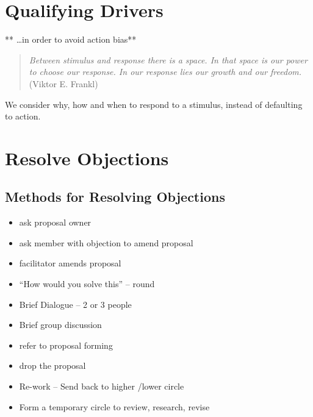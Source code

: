 \section{Qualifying Drivers}
\label{qualifyingdrivers}

** {\ldots}in order to avoid action bias**

\begin{quote}

\emph{Between stimulus and response there is a space. In that space is our power to choose our response. In our response lies our growth and our freedom.} (Viktor E. Frankl)
\end{quote}

We consider why, how and when to respond to a stimulus, instead of defaulting to action.

\section{Resolve Objections}
\label{resolveobjections}

\subsection{Methods for Resolving Objections}
\label{methodsforresolvingobjections}

\begin{itemize}
\item ask proposal owner

\item ask member with objection to amend proposal

\item facilitator amends proposal

\item ``How would you solve this'' – round

\item Brief Dialogue – 2 or 3 people

\item Brief group discussion

\item refer to proposal forming

\item drop the proposal

\item Re-work – Send back to higher \slash  lower circle

\item Form a temporary circle to review, research, revise

\end{itemize}

